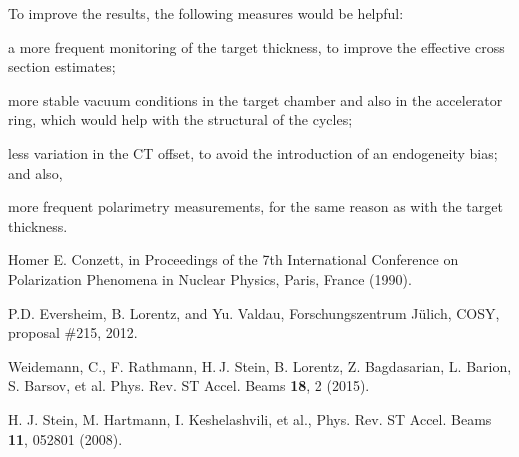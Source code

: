 \documentclass[reprint, superscriptaddress]{revtex4-1}
\begin{document}
To improve the results, the following measures would be helpful:
\begin{inparaenum}
	\item a more frequent monitoring of the target thickness, to improve the effective cross section estimates;
	\item more stable vacuum conditions in the target chamber and also in the accelerator ring, which would help with the structural of the cycles;
	\item less variation in the CT offset, to avoid the introduction of an endogeneity bias; and also,
	\item more frequent polarimetry measurements, for the same reason as with the target thickness.
\end{inparaenum}

\begin{thebibliography}{9}
Homer E. Conzett, in Proceedings of the 7th International Conference on Polarization Phenomena in Nuclear Physics, Paris, France (1990).

P.D. Eversheim, B. Lorentz, and Yu. Valdau, Forschungszentrum J\"ulich, COSY, proposal \#215, 2012.

Weidemann, C., F. Rathmann, H. J. Stein, B. Lorentz, Z. Bagdasarian, L. Barion, S. Barsov, et al. Phys. Rev. ST Accel. Beams \textbf{18}, 2 (2015).


H. J. Stein, M. Hartmann, I. Keshelashvili, et al., Phys. Rev. ST Accel. Beams \textbf{11}, 052801 (2008).

\end{thebibliography}
\end{document}
